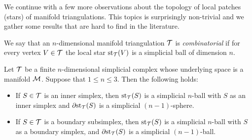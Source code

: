 \documentclass[10pt,a4paper]{article}
\begin{document}
We continue with a few more observations about the topology of local patches (stars) of manifold triangulations. This topics is surprisingly non-trivial and 
we gather some results that are hard to find in the literature. 

We say that an $n$-dimensional manifold triangulation ${\mathcal T}$ is \emph{combinatorial}
if for every vertex $V \in {\mathcal T}$ the local star $\operatorname{st}_{{\mathcal T}}(V)$ is a simplicial ball of dimension $n$. 

\begin{lemma}\label{lemma:startopology}
    Let ${\mathcal T}$ be a finite $n$-dimensional simplicial complex whose underlying space is a manifold ${\mathcal M}$.
    Suppose that $1 \leq n \leq 3$. Then the following holds:
    \begin{itemize}
        \item
        If $S \in {\mathcal T}$ is an inner simplex, 
        then $\operatorname{st}_{{\mathcal T}}(S)$ is a simplicial $n$-ball with $S$ as an inner simplex
        and ${\partial \rm st}_{{\mathcal T}}(S)$ is a simplicial $(n-1)$-sphere. 
        \item
        If $S \in {\mathcal T}$ is a boundary subsimplex, 
        then $\operatorname{st}_{{\mathcal T}}(S)$ is a simplicial $n$-ball with $S$ as a boundary simplex,
        and ${\partial \rm st}_{{\mathcal T}}(S)$ is a simplicial $(n-1)$-ball.
    \end{itemize}
\end{lemma}
\end{document}
